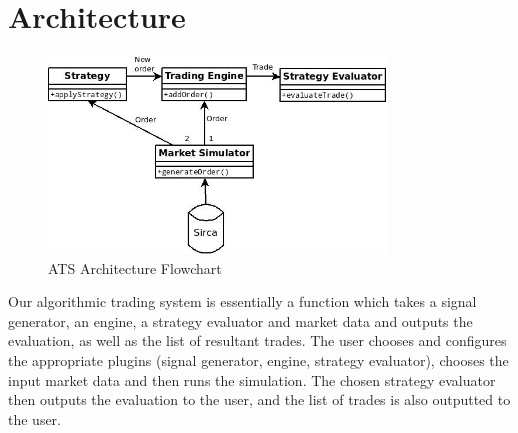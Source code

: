 \documentclass{article}
\begin{document}
\maketitle


\section{Architecture}

\begin{figure}
\centering
\includegraphics[width=0.8\textwidth]{architecture}
\caption{ATS Architecture Flowchart}
\label{fig:architecture}
\end{figure}

Our algorithmic trading system is essentially a function which takes a signal generator, an engine, a strategy evaluator and market data and outputs the evaluation, as well as the list of resultant trades. The user chooses and configures the appropriate plugins (signal generator, engine, strategy evaluator), chooses the input market data and then runs the simulation. The chosen strategy evaluator then outputs the evaluation to the user, and the list of trades is also outputted to the user.
\end{document}
